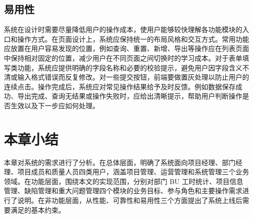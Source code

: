 \subsection{易用性}
系统在设计时需要尽量降低用户的操作成本，使用户能够较快理解各功能模块的入口和操作方式。在页面设计上，系统应保持统一的布局风格和交互方式。常用功能应放置在用户容易发现的位置，例如查询、重置、新增、导出等操作应在列表页面中保持相对固定的位置，减少用户在不同页面之间切换时的学习成本。对于表单填写类功能，系统应提供明确的字段名称和必要的校验提示，避免用户因字段含义不清或输入格式错误而反复修改。对一些提交按钮，前端要做置灰处理以防止用户的连续点击。操作完成后，系统应对常见操作结果给予及时反馈。例如数据保存成功、导出完成、查询无结果或操作失败时，应给出清晰提示，帮助用户判断操作是否生效以及下一步应如何处理。

\section{本章小结}
本章对系统的需求进行了分析。在总体层面，明确了系统面向项目经理、部门经理、项目成员和质量人员四类用户，涵盖项目管理、运营管理和系统管理三个业务领域。在功能层面，围绕本文的实现范围，分别对部门 BU 工时统计、项目信息管理、缺陷管理和重大问题管理四个模块的业务目标、参与角色和主要操作需求进行了说明。在非功能层面，从性能、可靠性和易用性三个方面提出了系统上线后需要满足的基本约束。

